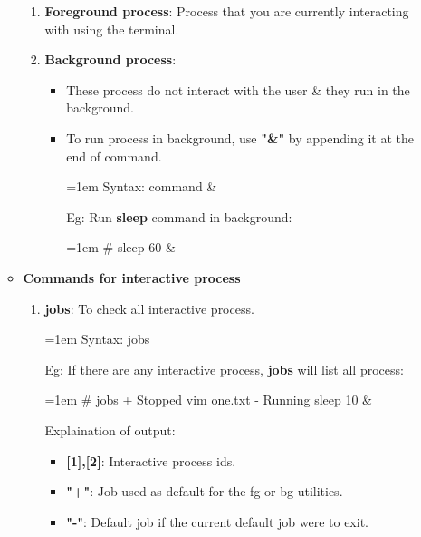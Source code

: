 \begin{flushleft}
\begin{enumerate}
\begin{itemize}
		\begin{enumerate}
			\item \textbf{Foreground process}: Process that you are currently interacting with using the terminal.
			\item \textbf{Background process}: 
			\begin{itemize}
				\item These process do not interact with the user \& they run in the background.
				\item To run process in background, use \textbf{"\&"} by appending it at the end of command.
				\bigskip
				\begin{tcolorbox}[breakable,notitle,boxrule=-0pt,colback=pink,colframe=pink]
					\color{black}
					\font=1em
					Syntax: command \&
					\font=4pt
				\end{tcolorbox}
				Eg: Run \textbf{sleep} command in background:
				\begin{tcolorbox}[breakable,notitle,boxrule=-0pt,colback=black,colframe=black]
					\color{green}
					\fontdimen2\font=1em
					\#  sleep 60 \&
					\fontdimen2\font=4pt
				\end{tcolorbox}
			\end{itemize}
		\end{enumerate}
		
		\newpage
		
		
		
		\item \textbf{Commands for interactive process}
		\begin{enumerate}
			\item \textbf{jobs}: To check all interactive process.
			\bigskip
			\begin{tcolorbox}[breakable,notitle,boxrule=-0pt,colback=pink,colframe=pink]
				\color{black}
				\fontdimen2\font=1em
				Syntax: jobs
				\fontdimen2\font=4pt
			\end{tcolorbox}
			
			Eg: If there are any interactive process, \textbf{jobs} will list all process:
			\begin{tcolorbox}[breakable,notitle,boxrule=-0pt,colback=black,colframe=black]
				\color{green}
				\font=1em
				\#  jobs
				\color{white}
				\newline
				[1]+  Stopped                 vim one.txt
				\newline
				[2]-  Running                 sleep 10 \&
				\font=4pt
			\end{tcolorbox}
			Explaination of output:
			\begin{itemize}
				\item \textbf{[1],[2]}: Interactive process ids.
				\item \textbf{"+"}: Job used as default for the fg or bg utilities. 
				\item \textbf{"-"}: Default job if the current default job were to exit.
			\end{itemize}	
			

\end{enumerate}
\end{itemize}
\end{enumerate}
\end{flushleft}
